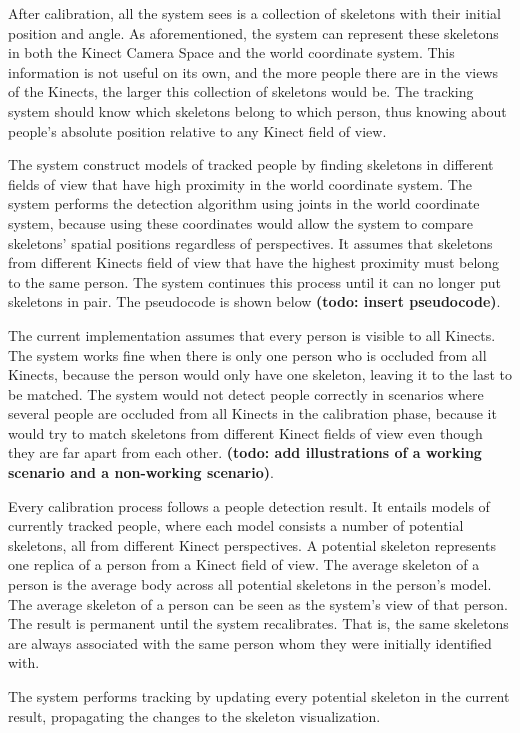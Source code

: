 \documentclass{sigchi}
\begin{document}
After calibration, all the system sees is a collection of skeletons with their initial position and angle. As aforementioned, the system can represent these skeletons in both the Kinect Camera Space and the world coordinate system. This information is not useful on its own, and the more people there are in the views of the Kinects, the larger this collection of skeletons would be. The tracking system should know which skeletons belong to which person, thus knowing about people's absolute position relative to any Kinect field of view.

The system construct models of tracked people by finding skeletons in different fields of view that have high proximity in the world coordinate system. The system performs the detection algorithm using joints in the world coordinate system, because using these coordinates would allow the system to compare skeletons' spatial positions regardless of perspectives. It assumes that skeletons from different Kinects field of view that have the highest proximity must belong to the same person. The system continues this process until it can no longer put skeletons in pair. The pseudocode is shown below \textbf{(todo: insert pseudocode)}.

The current implementation assumes that every person is visible to all Kinects. The system works fine when there is only one person who is occluded from all Kinects, because the person would only have one skeleton, leaving it to the last to be matched. The system would not detect people correctly in scenarios where several people are occluded from all Kinects in the calibration phase, because it would try to match skeletons from different Kinect fields of view even though they are far apart from each other. \textbf{(todo: add illustrations of a working scenario and a non-working scenario)}.

Every calibration process follows a people detection result. It entails models of currently tracked people, where each model consists a number of potential skeletons, all from different Kinect perspectives. A potential skeleton represents one replica of a person from a Kinect field of view. The average skeleton of a person is the average body across all potential skeletons in the person's model. The average skeleton of a person can be seen as the system's view of that person. The result is permanent until the system recalibrates. That is, the same skeletons are always associated with the same person whom they were initially identified with. 

The system performs tracking by updating every potential skeleton in the current result, propagating the changes to the skeleton visualization.
\end{document}
